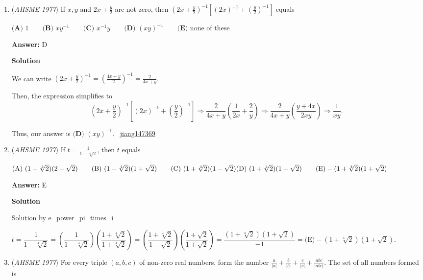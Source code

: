\begin{enumerate}
 


	\item (\textit{AHSME 1977}) If $x, y$ and $2x + \frac{y}{2}$ are not zero, then
$\left( 2x + \frac{y}{2} \right)^{-1} \left[(2x)^{-1} + \left( \frac{y}{2} \right)^{-1} \right]$
equals


 $\textbf{(A) }1\qquad \textbf{(B) }xy^{-1}\qquad \textbf{(C) }x^{-1}y\qquad \textbf{(D) }(xy)^{-1}\qquad  \textbf{(E) }\text{none of these}$

 \textbf{Answer: }D



\textbf{Solution}

We can write $\left( 2x+ \frac{y}{2} \right)^{-1} = \left( \frac{4x+y}{2} \right)^{-1} = \frac{2}{4x+y}$.

 Then, the expression simplifies to 
 \[\left( 2x + \frac{y}{2} \right)^{-1} \left[(2x)^{-1} + \left( \frac{y}{2} \right)^{-1} \right] \Rightarrow \frac{2}{4x+y} \left( \frac{1}{2x} + \frac{2}{y} \right) \Rightarrow \frac{2}{4x+y} \left( \frac{y+4x}{2xy} \right) \Rightarrow \frac{1}{xy}.\]

 
Thus, our answer is $\textbf{(D) }(xy)^{-1}$. ~\href{https://artofproblemsolving.com/wiki/index.php?title=User:Jiang147369}{jiang147369}

 


 


	\item (\textit{AHSME 1977}) If $t = \frac{1}{1 - \sqrt[4]{2}}$, then $t$ equals 


 $\text{(A)}\ (1-\sqrt[4]{2})(2-\sqrt{2})\qquad \text{(B)}\ (1-\sqrt[4]{2})(1+\sqrt{2})\qquad \text{(C)}\ (1+\sqrt[4]{2})(1-\sqrt{2}) \qquad \\ \text{(D)}\ (1+\sqrt[4]{2})(1+\sqrt{2})\qquad \text{(E)}-(1+\sqrt[4]{2})(1+\sqrt{2})$

 \textbf{Answer: }E



\textbf{Solution}

Solution by e\_power\_pi\_times\_i

 $t = \dfrac{1}{1-\sqrt[4]{2}} = (\dfrac{1}{1-\sqrt[4]{2}})(\dfrac{1+\sqrt[4]{2}}{1+\sqrt[4]{2}}) = (\dfrac{1+\sqrt[4]{2}}{1-\sqrt{2}})(\dfrac{1+\sqrt{2}}{1+\sqrt{2}}) = \dfrac{(1+\sqrt[4]{2})(1+\sqrt{2})}{-1} = \text{(E)}-(1+\sqrt[4]{2})(1+\sqrt{2})$.

 


	\item (\textit{AHSME 1977}) For every triple $(a,b,c)$ of non-zero real numbers, form the number $\frac{a}{|a|}+\frac{b}{|b|}+\frac{c}{|c|}+\frac{abc}{|abc|}$. 
The set of all numbers formed is



\end{enumerate}
